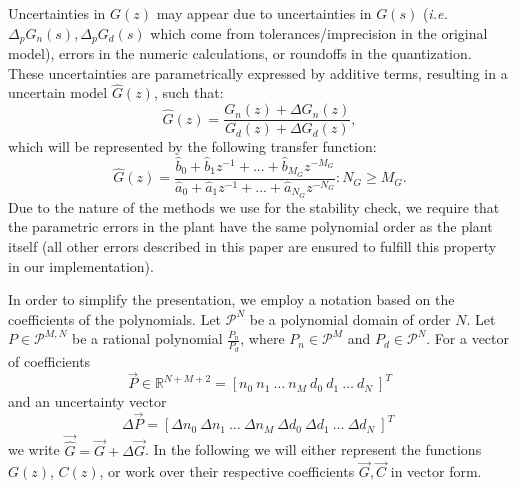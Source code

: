 \documentclass{sig-alternate-05-2015}
\begin{document}
Uncertainties in $G(z)$ may appear due to uncertainties in $G(s)$
(\emph{i.e.} $\Delta_p{G}_n(s),\Delta_p{G}_d(s)$ which come from tolerances/imprecision in the original model), errors in the numeric
calculations, or roundoffs in the quantization.  These uncertainties are 
parametrically expressed by additive terms, resulting in a uncertain model
$\hat{G}(z)$, such that:
%
\begin{equation}
\hat{G}(z)=\frac{G_n(z)+\Delta G_n(z)}{G_d(z)+\Delta G_d(z)},
\end{equation}
%
which will be represented by the following transfer function:
%
\begin{equation}
\hat{G}(z)=\frac{\hat{b}_{0}+\hat{b}_{1}z^{-1}+...+\hat{b}_{M_G}z^{-M_G}}{\hat{a}_{0}+\hat{a}_{1}z^{-1}+...+\hat{a}_{N_G}z^{-N_G}} : N_G \geq M_G .
\end{equation}
%
Due to the nature of the methods we use for the stability check, we require
that the parametric errors in the plant have the same polynomial order as
the plant itself (all other errors described in this paper are ensured to fulfill this property in our
implementation).

In order to simplify the presentation, we employ a notation based on the
coefficients of the polynomials.  Let $\mathcal{P}^{N}$ be a polynomial
domain of order $N$. Let $P \in \mathcal{P}^{M,N}$ be a rational polynomial
$\frac{P_n}{P_d}$, where $P_n \in \mathcal{P}^{M}$ and $P_d \in \mathcal{P}^{N}$.  
For a vector of coefficients
%
\begin{equation}
\vec{P} \in \mathbb{R}^{N+M+2}=[n_{0}\ n_{1}\ \hdots \ n_{M}\ d_{0}\ d_{1}\ \hdots\ d_{N}\ ]^T
\label{eq:coefficients}
\end{equation}
%
and an uncertainty vector 
%
\begin{equation}
\Delta{\vec{P}}=[\Delta{n}_{0}\ \Delta{n}_{1}\ \hdots \ \Delta{n}_{M}\ \Delta{d}_{0}\ \Delta{d}_{1}\ \hdots\ \Delta{d}_{N}\ ]^T \; 
\label{eq:delta_coefficients}
\end{equation}
%
we write $\vec{\hat{G}}=\vec{G}+\Delta{\vec{G}}$.   
In the following we will either represent the functions $G(z)$, $C(z)$, 
or work over their respective coefficients $\vec{G}, \vec{C}$ in vector form.   
\end{document}
